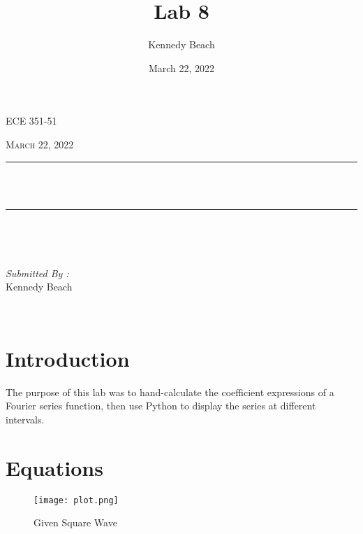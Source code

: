 \documentclass[12pt]{report}
\title{Lab 8}
\author{Kennedy Beach}
\date{March 22, 2022}
\makeatletter
\let\thetitle\@title
\makeatother
\begin{document}
\begin{titlepage}
\centering
\vspace*{0.5 cm}
\begin{center}    \textsc{\Large   ECE 351-51 }\\[2.0 cm]
\end{center}%
\textsc{\Large March 22, 2022}\\[0.5 cm] %
\rule{\linewidth}{0.2 mm} \\[0.4 cm]
{ \huge \bfseries \thetitle}\\
\rule{\linewidth}{0.2 mm} \\[1.5 cm]
\begin{minipage}{0.4\textwidth}
\begin{flushleft} \large
\end{flushleft}
\end{minipage}~
\begin{minipage}{0.4\textwidth}
\begin{flushright} \large
\emph{Submitted By :} \\
Kennedy Beach
\end{flushright}
\end{minipage}\\[2 cm]
\end{titlepage}
\tableofcontents
\pagebreak
\renewcommand{\thesection}{\arabic{section}}
\section{Introduction}
The purpose of this lab was to hand-calculate the coefficient expressions of a Fourier series function, then use Python to display the series at different intervals.
\section{Equations}
\begin{figure}[htp]
    \centering
    \texttt{[image: plot.png]}
    \caption{Given Square Wave}
\end{figure}
\end{document}

